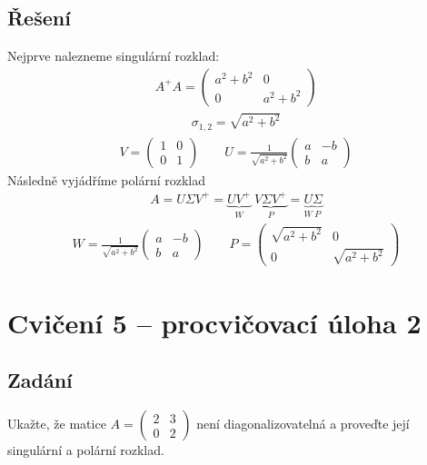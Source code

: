 \documentclass[]{article}
\newcommand{\mat}[1]{\begin{pmatrix}#1\end{pmatrix}}
\newcommand{\recipsqrt}[1]{\frac{1}{\sqrt{#1}}}
\begin{document}
\subsection{Řešení}
Nejprve nalezneme singulární rozklad:
\begin{align*}
  A^+A = \mat{a^2 + b^2 & 0 \\ 0 & a^2 + b^2}
\end{align*}
\begin{align*}
  \sigma_{1,2} = \sqrt{a^2 + b^2}
\end{align*}
\begin{align*}
  V = \mat{1&0\\0&1}
  \hspace{2em}
  U = \recipsqrt{a^2 + b^2} \mat{a & -b \\ b & a}
\end{align*}
Následně vyjádříme polární rozklad
\begin{align*}
  A = U \Sigma V^+ = \underbrace{UV^+}_W \; \underbrace{V \Sigma V^+}_P = \underbrace{U}_W \underbrace{\Sigma}_P
\end{align*}
\begin{align*}
  W = \recipsqrt{a^2 + b^2} \mat{a & -b \\ b & a}
  \hspace{2em}
  P = \mat{ \sqrt{a^2 + b^2} & 0 \\ 0 & \sqrt{a^2 + b^2} }
\end{align*}


\section{Cvičení 5 – procvičovací úloha 2}
\subsection{Zadání}
Ukažte, že matice $A = \mat{2 & 3 \\ 0 & 2}$ není diagonalizovatelná a proveďte její singulární a polární rozklad.
\end{document}
